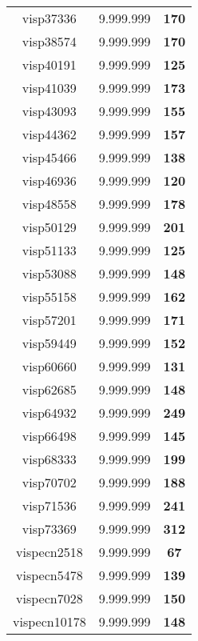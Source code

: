 \begin{tabular}{cc||c}
visp37336        & 9.999.999        & {\bf 170}       \\ 
visp38574        & 9.999.999        & {\bf 170}       \\ 
visp40191        & 9.999.999        & {\bf 125}       \\ 
visp41039        & 9.999.999        & {\bf 173}       \\ 
visp43093        & 9.999.999        & {\bf 155}       \\ 
visp44362        & 9.999.999        & {\bf 157}       \\ 
visp45466        & 9.999.999        & {\bf 138}       \\ 
visp46936        & 9.999.999        & {\bf 120}       \\ 
visp48558        & 9.999.999        & {\bf 178}       \\ 
visp50129        & 9.999.999        & {\bf 201}       \\ 
visp51133        & 9.999.999        & {\bf 125}       \\ 
visp53088        & 9.999.999        & {\bf 148}       \\ 
visp55158        & 9.999.999        & {\bf 162}       \\ 
visp57201        & 9.999.999        & {\bf 171}       \\ 
visp59449        & 9.999.999        & {\bf 152}       \\ 
visp60660        & 9.999.999        & {\bf 131}       \\ 
visp62685        & 9.999.999        & {\bf 148}       \\ 
visp64932        & 9.999.999        & {\bf 249}       \\ 
visp66498        & 9.999.999        & {\bf 145}       \\ 
visp68333        & 9.999.999        & {\bf 199}       \\ 
visp70702        & 9.999.999        & {\bf 188}       \\ 
visp71536        & 9.999.999        & {\bf 241}       \\ 
visp73369        & 9.999.999        & {\bf 312}       \\ 
vispecn2518      & 9.999.999        & {\bf 67}        \\ 
vispecn5478      & 9.999.999        & {\bf 139}       \\ 
vispecn7028      & 9.999.999        & {\bf 150}       \\ 
vispecn10178     & 9.999.999        & {\bf 148}       \\ 

\end{tabular}

